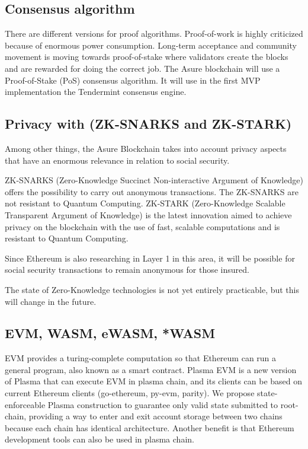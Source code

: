\subsection{Consensus algorithm}
There are different versions for proof algorithms. Proof-of-work is highly criticized because of enormous power consumption.\cite{hackernoon} Long-term acceptance and community movement is moving towards proof-of-stake where validators create the blocks and are rewarded for doing the correct job. The Asure blockchain will use a Proof-of-Stake (PoS) consensus algorithm. It will use in the first MVP implementation the Tendermint consensus engine.\cite{tendermint}

\subsection{Privacy with (ZK-SNARKS and ZK-STARK)}
Among other things, the Asure Blockchain takes into account privacy aspects that have an enormous relevance in relation to social security.

ZK-SNARKS (Zero-Knowledge Succinct Non-interactive Argument of Knowledge) offers the possibility to carry out anonymous transactions. The ZK-SNARKS are not resistant to Quantum Computing. ZK-STARK (Zero-Knowledge Scalable Transparent Argument of Knowledge) is the latest innovation aimed to achieve privacy on the blockchain with the use of fast, scalable computations and is resistant to Quantum Computing. \cite{iacr}

Since Ethereum is also researching in Layer 1 in this area, it will be possible for social security transactions to remain anonymous for those insured. \cite{ethereum_zksnarks}

The state of Zero-Knowledge technologies is not yet entirely practicable, but this will change in the future.

\subsection{EVM, WASM, eWASM, *WASM}
EVM provides a turing-complete computation so that Ethereum can run a general program, also known as a smart contract. Plasma EVM is a new version of Plasma that can execute EVM in plasma chain, and its clients can be based on current Ethereum clients (go-ethereum, py-evm, parity). We propose state-enforceable Plasma construction to guarantee only valid state submitted to root-chain, providing a way to enter and exit account storage between two chains because each chain has identical architecture. Another benefit is that Ethereum development tools can also be used in plasma chain.

